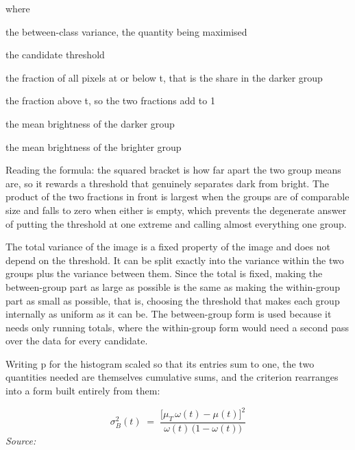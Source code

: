 \noindent where
\begin{description}[leftmargin=2.4em,style=nextline,font=\normalfont\ttfamily]\setlength\itemsep{1pt}
  \item[{$\sigma_B^2(t)$}] \normalfont the between-class variance, the quantity being maximised
  \item[{$t$}] \normalfont the candidate threshold
  \item[{$\omega_B(t)$}] \normalfont the fraction of all pixels at or below t, that is the share in the darker group
  \item[{$\omega_F(t)$}] \normalfont the fraction above t, so the two fractions add to 1
  \item[{$\mu_B(t)$}] \normalfont the mean brightness of the darker group
  \item[{$\mu_F(t)$}] \normalfont the mean brightness of the brighter group
\end{description}
Reading the formula: the squared bracket is how far apart the two group means are, so it rewards a threshold that genuinely separates dark from bright. The product of the two fractions in front is largest when the groups are of comparable size and falls to zero when either is empty, which prevents the degenerate answer of putting the threshold at one extreme and calling almost everything one group.


The total variance of the image is a fixed property of the image and does not depend on the threshold. It can be split exactly into the variance within the two groups plus the variance between them. Since the total is fixed, making the between-group part as large as possible is the same as making the within-group part as small as possible, that is, choosing the threshold that makes each group internally as uniform as it can be. The between-group form is used because it needs only running totals, where the within-group form would need a second pass over the data for every candidate.


Writing p for the histogram scaled so that its entries sum to one, the two quantities needed are themselves cumulative sums, and the criterion rearranges into a form built entirely from them:


\begin{equation}
\sigma_B^2(t)\;=\;\frac{\big[\mu_T\,\omega(t)-\mu(t)\big]^2}{\omega(t)\,\big(1-\omega(t)\big)}
\end{equation}
\noindent\emph{Source: }\cite{otsu1979}


